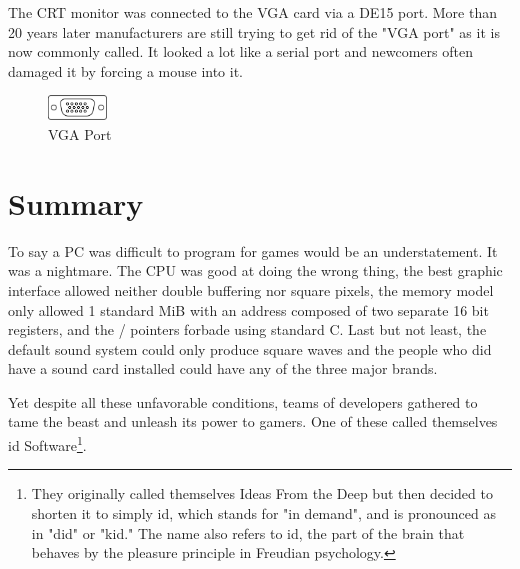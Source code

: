 \documentclass[book.tex]{subfiles}
\begin{document}
 The CRT monitor was connected to the VGA card via a DE15 port. More than 20 years later manufacturers are still trying to get rid of the "VGA port" as it is now commonly called. It looked a lot like a serial port and newcomers often damaged it by forcing a mouse into it.
 \begin{figure}[H]
\centering
\includegraphics[width=0.14\textwidth]{imgs/drawings/DE15_VGA.eps}
\caption{VGA Port}
\label{fig:ps2Port}
\end{figure}











\section{Summary}
To say a PC was difficult to program for games would be an understatement. It was a nightmare. The CPU was good at doing the wrong thing, the best graphic interface allowed neither double buffering nor square pixels, the memory model only allowed 1 standard MiB with an address composed of two separate 16 bit registers, and the / pointers forbade using standard C. Last but not least, the default sound system could only produce square waves and the people who did have a sound card installed could have any of the three major brands.\\
\par
Yet despite all these unfavorable conditions, teams of developers gathered to tame the beast and unleash its power to gamers. One of these called themselves id Software\footnote{They originally called themselves Ideas From the Deep but then decided to shorten it to simply id, which stands for "in demand", and is pronounced as in "did" or "kid." The name also refers to id, the part of the brain that behaves by the pleasure principle in Freudian psychology.}.
\end{document}
